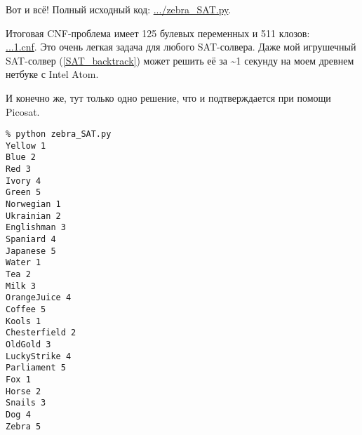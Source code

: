 Вот и всё!
Полный исходный код: \url{.../zebra_SAT.py}.

Итоговая CNF-проблема имеет 125 булевых переменных и 511 клозов: \\
\url{...1.cnf}.
Это очень легкая задача для любого SAT-солвера.
Даже мой игрушечный SAT-солвер (\ref{SAT_backtrack}) может решить её за \textasciitilde{}1 секунду на моем древнем
нетбуке с Intel Atom.

И конечно же, тут только одно решение, что и подтверждается при помощи Picosat.

\begin{lstlisting}
% python zebra_SAT.py
Yellow 1
Blue 2
Red 3
Ivory 4
Green 5
Norwegian 1
Ukrainian 2
Englishman 3
Spaniard 4
Japanese 5
Water 1
Tea 2
Milk 3
OrangeJuice 4
Coffee 5
Kools 1
Chesterfield 2
OldGold 3
LuckyStrike 4
Parliament 5
Fox 1
Horse 2
Snails 3
Dog 4
Zebra 5
\end{lstlisting}

